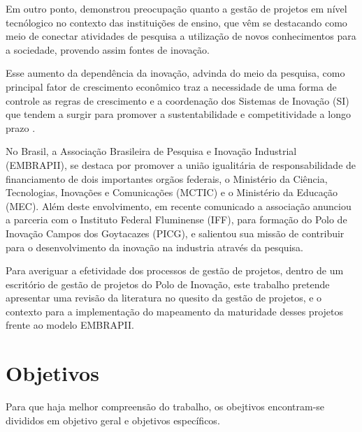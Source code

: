   Em outro ponto,  demonstrou preocupação quanto a gestão de projetos em nível tecnólogico no contexto das instituições de ensino, que vêm se destacando como meio de conectar atividades de pesquisa a utilização de novos conhecimentos para a sociedade, provendo assim fontes de inovação.

  Esse aumento da dependência da inovação, advinda do meio da pesquisa, como principal fator de crescimento econômico traz a necessidade de uma forma de controle as regras de crescimento e a coordenação dos Sistemas de Inovação (SI) que tendem a surgir para promover a sustentabilidade e competitividade a longo prazo \cite{lundvall2010politicas}.

  No Brasil, a Associação Brasileira de Pesquisa e Inovação Industrial (EMBRAPII), se destaca por promover a união igualitária de responsabilidade de financiamento de dois importantes orgãos federais, o Ministério da Ciência, Tecnologias, Inovações e Comunicações (MCTIC) e o Ministério da Educação (MEC). Além deste envolvimento, em recente comunicado a associação anunciou a parceria com o Instituto Federal Fluminense (IFF), para formação do Polo de Inovação Campos dos Goytacazes (PICG), e salientou sua missão de contribuir para o desenvolvimento da inovação na industria através da pesquisa.

  Para averiguar a efetividade dos processos de gestão de projetos, dentro de um escritório de gestão de projetos do Polo de Inovação, este trabalho pretende apresentar uma revisão da literatura no quesito da gestão de projetos, e o contexto para a implementação do mapeamento da maturidade desses projetos frente ao modelo EMBRAPII.



\section{Objetivos}

  Para que haja melhor compreensão do trabalho, os obejtivos encontram-se divididos em objetivo geral e objetivos específicos.

